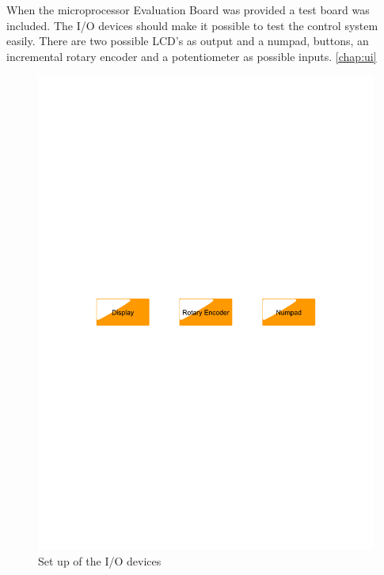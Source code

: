 When the microprocessor Evaluation Board was provided a test board was included. The I/O devices should make it possible to test the control system easily. There are two possible LCD's as output and a numpad, buttons, an incremental rotary encoder and a potentiometer as possible inputs. \ref{chap:ui}
\begin{figure}[htb]
	\centering
	\includegraphics[scale=0.5,clip,trim=00 400 00 400]{graphics/iodevices} %
	\caption{Set up of the I/O devices}
	\label{fig:iodevices}			%
\end{figure}


